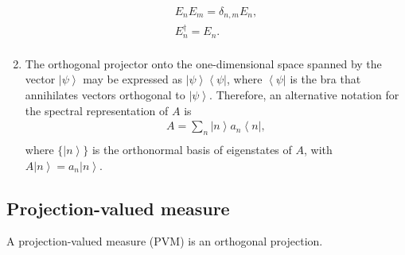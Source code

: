 \documentclass[onecolumn,pra,superscriptaddress,nofootinbib]{revtex4-1}
\newcommand{\bra}[1]{\mbox{$\left\langle #1 \right|$}}
\newcommand{\ket}[1]{\mbox{$\left| #1 \right\rangle$}}
\begin{document}
\begin{enumerate}
\begin{equation} \label{eigenvectors}
\begin{aligned}
E_nE_m=\delta_{n,m}E_n,\\
E_n^\dag=E_n.\\
\end{aligned}
\end{equation}

\item
The orthogonal projector onto the one-dimensional space spanned by the vector $\ket{\psi}$ may be expressed as $\ket{\psi}\bra{\psi}$, where $\bra{\psi}$ is the bra that annihilates
vectors orthogonal to $\ket{\psi}$. Therefore, an alternative notation for the spectral representation of $A$ is
 \begin{equation} \label{spectral representation}
\begin{aligned}
A=\sum_n\ket{n}a_n\bra{n},\\
\end{aligned}
\end{equation}
where $\{\ket{n}\}$ is the orthonormal basis of eigenstates of $A$, with $A\ket{n} =a_n\ket{n}$.

\end{enumerate}




\subsection{Projection-valued measure}
A projection-valued measure (PVM) is an orthogonal projection.
\end{document}
